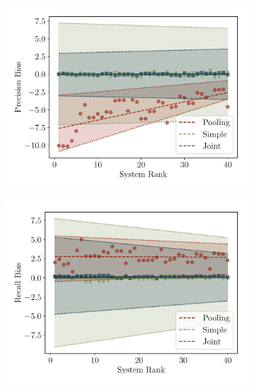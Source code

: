 \begin{figure}[t]
  \centering
  \begin{subfigure}{0.32\textwidth}
    \includegraphics[width=\textwidth]{figures/simulation/simulation-p}
    \caption{}
  \end{subfigure}
  \begin{subfigure}{0.32\textwidth}
    \includegraphics[width=\textwidth]{figures/simulation/simulation-r}
    \caption{}
  \end{subfigure}
  \begin{subfigure}{0.32\textwidth}
    
    \vfill
    \caption{\label{fig:evaluation-results}}
  \end{subfigure}


\end{figure}
